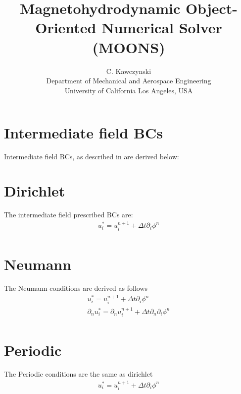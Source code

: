 \documentclass[landscape]{article}
\newcommand{\PD}{\partial}
\begin{document}
\doublespacing
\title{Magnetohydrodynamic Object-Oriented Numerical Solver (MOONS)}
\author{C. Kawczynski \\
Department of Mechanical and Aerospace Engineering \\
University of California Los Angeles, USA\\
}

\section{Intermediate field BCs}
Intermediate field BCs, as described in \cite{Kim} are derived below:

\section{Dirichlet}
The intermediate field prescribed BCs are:
\begin{equation}\begin{aligned}
  u_i^* = u_i^{n+1} + \Delta t \PD_i \phi^n \\
\end{aligned}\end{equation}
\section{Neumann}
The Neumann conditions are derived as follows
\begin{equation}\begin{aligned}
  u_i^* = u_i^{n+1} + \Delta t \PD_i \phi^n \\
  \PD_n u_i^* = \PD_n u_i^{n+1} + \Delta t \PD_n \PD_i \phi^n \\
\end{aligned}\end{equation}
\section{Periodic}
The Periodic conditions are the same as dirichlet
\begin{equation}\begin{aligned}
  u_i^* = u_i^{n+1} + \Delta t \PD_i \phi^n \\
\end{aligned}\end{equation}
\end{document}
